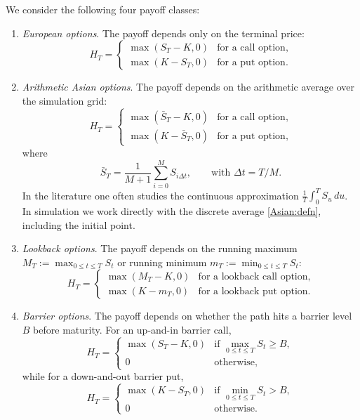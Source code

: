 \documentclass[letterpaper]{article}
\numberwithin{equation}{section}
\theoremstyle{definition}
\theoremstyle{remark}
\begin{document}
We consider the following four payoff classes:
\begin{enumerate}
    \item \textit{European options}. The payoff depends only on the terminal price:
    \[
        H_T = \begin{cases}
        \max(S_T - K, 0) & \text{for a call option},\\
        \max(K - S_T, 0) & \text{for a put option}.
        \end{cases}
    \]

    \item \textit{Arithmetic Asian options}. The payoff depends on the arithmetic average over the simulation grid:
    \[
        H_T = \begin{cases}
        \max(\bar{S}_T - K, 0) & \text{for a call option},\\
        \max(K-\bar{S}_T, 0) & \text{for a put option},
        \end{cases}
    \]
    where
    \begin{equation}\label{Asian:defn}
    \bar{S}_T = \frac{1}{M+1}\sum_{i=0}^{M} S_{i\Delta t},\qquad\text{with }\Delta t = T/M.
    \end{equation}
    In the literature one often studies the continuous approximation
    $\frac{1}{T}\int_0^T S_u\,du$. In simulation we work directly with the
    discrete average \eqref{Asian:defn}, including the initial point.

    \item \textit{Lookback options}. The payoff depends on the running maximum
    $M_T := \max_{0\leq t\leq T} S_t$ or running minimum
    $m_T := \min_{0\leq t\leq T} S_t$:
    \[
        H_T = \begin{cases}
        \max(M_T-K,0) & \text{for a lookback call option},\\
        \max(K-m_T,0) & \text{for a lookback put option}.
        \end{cases}
    \]

    \item \textit{Barrier options}. The payoff depends on whether the path hits
    a barrier level $B$ before maturity. For an up-and-in barrier call,
    \[
        H_T = \begin{cases}
        \max(S_T - K, 0) & \text{if } \max_{0\leq t\leq T} S_t \geq B,\\
        0 & \text{otherwise},
        \end{cases}
    \]
    while for a down-and-out barrier put,
    \[
        H_T = \begin{cases}
        \max(K - S_T, 0) & \text{if } \min_{0\leq t\leq T} S_t > B,\\
        0 & \text{otherwise}.
        \end{cases}
    \]
\end{enumerate}
\end{document}
